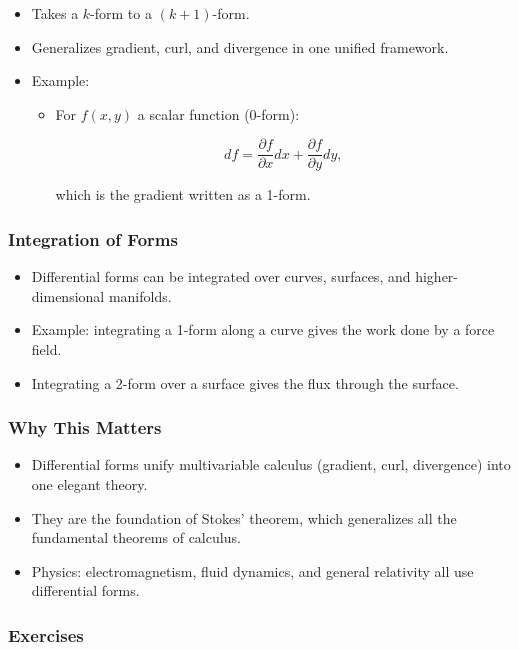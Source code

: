 \documentclass[
  letterpaper,
  DIV=11,
  numbers=noendperiod]{scrreprt}
\providecommand{\tightlist}{%
  \setlength{\itemsep}{0pt}\setlength{\parskip}{0pt}}
\begin{document}
\begin{itemize}
\item
  Takes a \(k\)-form to a \((k+1)\)-form.
\item
  Generalizes gradient, curl, and divergence in one unified framework.
\item
  Example:

  \begin{itemize}
  \item
    For \(f(x,y)\) a scalar function (0-form):

    \[
    df = \frac{\partial f}{\partial x} dx + \frac{\partial f}{\partial y} dy,
    \]

    which is the gradient written as a 1-form.
  \end{itemize}
\end{itemize}

\subsubsection{Integration of Forms}\label{integration-of-forms}

\begin{itemize}
\tightlist
\item
  Differential forms can be integrated over curves, surfaces, and
  higher-dimensional manifolds.
\item
  Example: integrating a 1-form along a curve gives the work done by a
  force field.
\item
  Integrating a 2-form over a surface gives the flux through the
  surface.
\end{itemize}

\subsubsection{Why This Matters}\label{why-this-matters-19}

\begin{itemize}
\tightlist
\item
  Differential forms unify multivariable calculus (gradient, curl,
  divergence) into one elegant theory.
\item
  They are the foundation of Stokes' theorem, which generalizes all the
  fundamental theorems of calculus.
\item
  Physics: electromagnetism, fluid dynamics, and general relativity all
  use differential forms.
\end{itemize}

\subsubsection{Exercises}\label{exercises-31}
\end{document}
